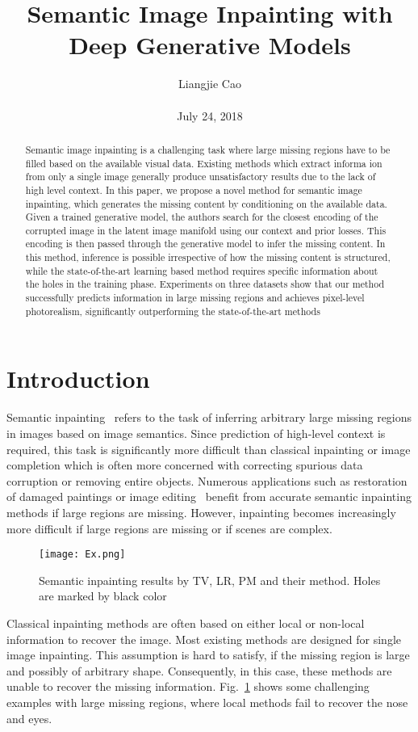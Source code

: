 \documentclass[10pt,twocolumn,letterpaper]{article}
\begin{document}
\title{\textbf{Semantic Image Inpainting with Deep Generative Models}}
\author{Liangjie Cao\\\\ July 24, 2018}
\maketitle
\begin{abstract}
Semantic image inpainting is a challenging task where large missing regions have to be filled based on the available visual data. Existing methods which extract informa ion from only a single image generally produce unsatisfactory results due to the lack of high level context. In this paper, we propose a novel method for semantic image inpainting, which generates the missing content by conditioning
on the available data. Given a trained generative model,
the authors search for the closest encoding of the corrupted image
in the latent image manifold using our context and prior
losses. This encoding is then passed through the generative
model to infer the missing content. In this method, inference is possible irrespective of how the missing content is
structured, while the state-of-the-art learning based method
requires specific information about the holes in the training
phase. Experiments on three datasets show that our method
successfully predicts information in large missing regions
and achieves pixel-level photorealism, significantly outperforming the state-of-the-art methods
\end{abstract}
\section{Introduction}
Semantic inpainting~\cite{name30} refers to the task of inferring arbitrary large missing regions in images based on image semantics. Since prediction of high-level context is required, this task is significantly more difficult than classical inpainting or image completion which is often more concerned with correcting spurious data corruption or removing entire objects. Numerous applications such as restoration of damaged paintings or image editing~\cite{name3} benefit from accurate semantic inpainting methods if large regions are missing. However, inpainting becomes increasingly more difficult if large regions are missing or if scenes are complex.
\begin{figure}[!htb]
	\centering
	\texttt{[image: Ex.png]}\\
	\caption{Semantic inpainting results by TV, LR, PM and their method. Holes are marked by black color}\label{Figure1}
\end{figure}
\par Classical inpainting methods are often based on either
local or non-local information to recover the image. Most
existing methods are designed for single image inpainting. This assumption is hard to satisfy, if the missing region is large and possibly of arbitrary shape. Consequently, in this case, these methods are unable to recover the missing information. Fig.~\ref{Figure1} shows some challenging examples with large missing regions, where local methods fail to recover the nose and eyes.
\end{document}
